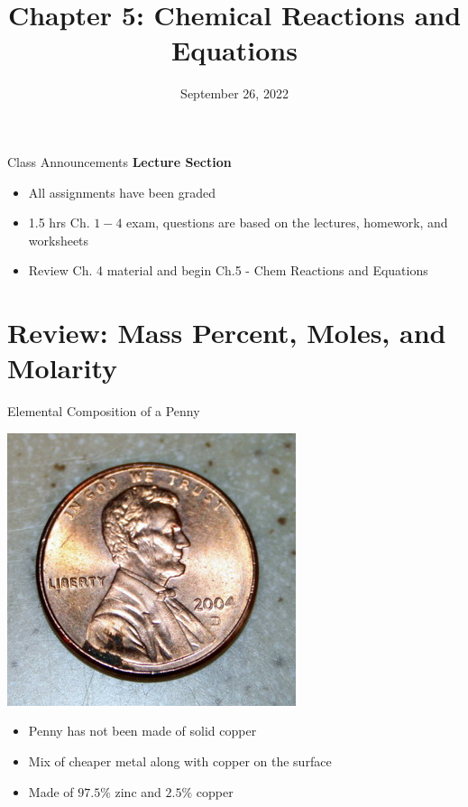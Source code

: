 \documentclass[11pt]{beamer}
\title{Chapter 5: Chemical Reactions and Equations}
\institute{Chemistry Department, Cypress College}
\date{September 26, 2022}
\begin{document}
\begin{frame}
  \titlepage
\end{frame}

\begin{frame}{Class Announcements}
  \textbf{Lecture Section}
  \begin{itemize}
  \item All assignments have been graded
  \item 1.5 hrs Ch. $1 - 4$ exam, questions are based on the lectures,
    homework, and worksheets
  \item Review Ch. 4 material and begin Ch.5 - Chem Reactions and Equations
  \end{itemize}
\end{frame}

\section{Review: Mass Percent, Moles, and Molarity}

\begin{frame}{Elemental Composition of a Penny}
  \begin{center}
    \includegraphics[scale=0.3]{penny_2004}
  \end{center}

  \begin{itemize}
  \item Penny has not been made of solid copper
  \item Mix of cheaper metal along with copper on the surface
  \item Made of $97.5\%$ zinc and $2.5\%$ copper
  \end{itemize}
\end{frame}
\end{document}
